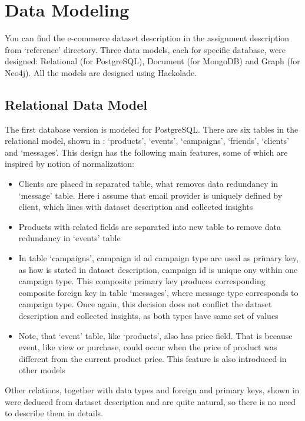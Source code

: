 \documentclass[conference]{IEEEtran}
\begin{document}
\section{Data Modeling}
You can find the e-commerce dataset description in the assignment description from `reference' directory. Three data models, each for specific database, were designed: Relational (for PostgreSQL), Document (for MongoDB) and Graph (for Neo4j). All the models are designed using Hackolade.

\subsection{Relational Data Model}
The first database version is modeled for PostgreSQL. There are six tables in the relational model, shown in : `products', `events', `campaigns', `friends', `clients' and `messages'. This design has the following main features, some of which are inspired by notion of normalization:
\begin{itemize}
    \item Clients are placed in separated table, what removes data redundancy in `message' table. Here i assume that email provider is uniquely defined by client, which lines with dataset description and collected insights
    \item Products with related fields are separated into new table to remove data redundancy in `events' table
    \item In table `campaigns', campaign id ad campaign type are used as primary key, as how is stated in dataset description, campaign id is unique ony within one campaign type. This composite primary key produces corresponding composite foreign key in table `messages', where message type corresponds to campaign type. Once again, this decision does not conflict the dataset description and collected insights, as both types have same set of values
    \item Note, that `event' table, like `products', also has price field. That is because event, like view or purchase, could occur when the price of product was different from the current product price. This feature is also  introduced in other models
\end{itemize}

Other relations, together with data types and foreign and primary keys, shown in  were deduced from dataset description and are quite natural, so there is no need to describe them in details.
\end{document}
